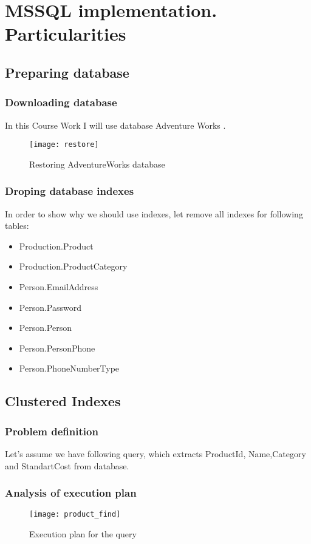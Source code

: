 \section{MSSQL implementation. Particularities}
\subsection{Preparing database}
\subsubsection{Downloading database}
In this Course Work I will use database Adventure Works \cite{AdventureWorks}. 
\begin{figure}[ht!]
	\centering
	\texttt{[image: restore]}
	\caption{Restoring AdventureWorks database}
\end{figure}

\subsubsection{Droping database indexes}
In order to show why we should use indexes, let remove all indexes for following tables:
\begin{itemize}
	\item Production.Product
	\item Production.ProductCategory
	\item Person.EmailAddress
	\item Person.Password
	\item Person.Person
	\item Person.PersonPhone\textsl{}
	\item Person.PhoneNumberType
\end{itemize}

\subsection{Clustered Indexes}
\subsubsection{Problem definition}
Let's assume we have following query, which extracts ProductId, Name,Category and StandartCost from database.


\subsubsection{Analysis of execution plan}
\begin{figure}[ht!]
	\centering
	\texttt{[image: product\_find]}
	\caption{Execution plan for the query}
\end{figure}


